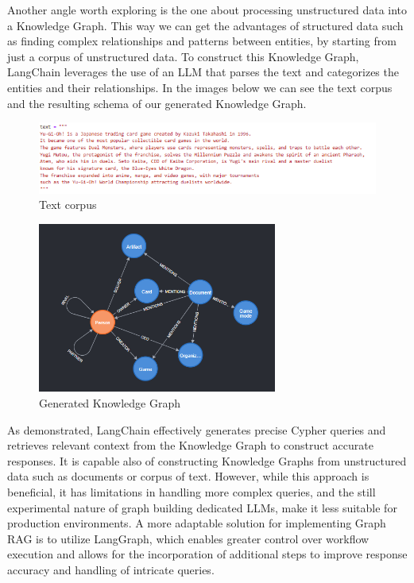 Another angle worth exploring is the one about processing unstructured data into a Knowledge Graph. This way we can get the advantages of structured data such as finding complex relationships and patterns between entities, by starting from just a corpus of unstructured data. To construct this Knowledge Graph, LangChain leverages the use of an LLM that parses the text and categorizes the entities and their relationships. In the images below we can see the text corpus and the resulting schema of our generated Knowledge Graph.
\begin{figure}[h]
    \centering
    \includegraphics[width=1.1\textwidth]{IMAGES/immagine_2025-03-31_164059272.png}
    \caption{Text corpus}
    \label{fig:Matching Nodes}
\end{figure}
\begin{figure}[h]
    \centering
    \includegraphics[width=0.7\textwidth]{IMAGES/immagine_2025-03-31_163821435.png}
    \caption{Generated Knowledge Graph}
    \label{fig:Matching Nodes}
\end{figure}


As demonstrated, LangChain effectively generates precise Cypher queries and retrieves relevant context from the Knowledge Graph to construct accurate responses. It is capable also of constructing Knowledge Graphs from unstructured data such as documents or corpus of text. However, while this approach is beneficial, it has limitations in handling more complex queries, and the still experimental nature of graph building dedicated LLMs, make it less suitable for production environments. A more adaptable solution for implementing Graph RAG is to utilize LangGraph, which enables greater control over workflow execution and allows for the incorporation of additional steps to improve response accuracy and handling of intricate queries.


